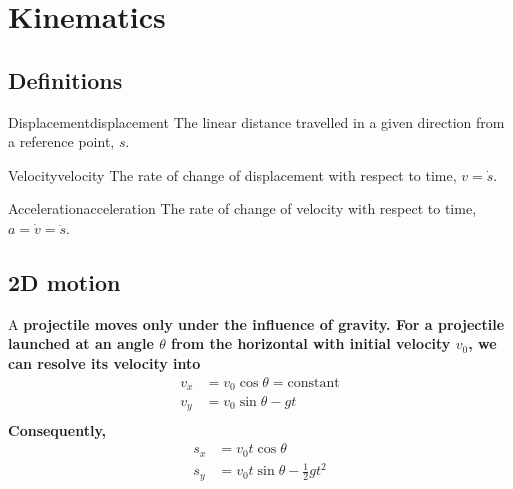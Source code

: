 \chapter{Kinematics}
\section{Definitions}
\begin{definition}{Displacement}{displacement}
	The linear distance travelled in a given direction from a reference point, \(s\).
\end{definition}
\begin{definition}{Velocity}{velocity}
	The rate of change of displacement with respect to time, \(v = \dot{s}\).
\end{definition}
\begin{definition}{Acceleration}{acceleration}
	The rate of change of velocity with respect to time, \(a = \dot{v}= \ddot{s}\).
\end{definition}

\section{2D motion}
A \bf{projectile} moves only under the influence of gravity. For a projectile
launched at an angle \(\theta\) from the horizontal with initial velocity \(v_0\), we can resolve its velocity
into
\begin{equation*}
	\begin{aligned}
		v_x & = v_0\cos\theta = \text{constant} \\
		v_y & = v_0\sin\theta-gt                \\
	\end{aligned}
\end{equation*}
Consequently,
\begin{equation*}
	\begin{aligned}
		s_x & = v_0t\cos\theta                   \\
		s_y & = v_0t\sin\theta - \frac{1}{2}gt^2 \\
	\end{aligned}
\end{equation*}